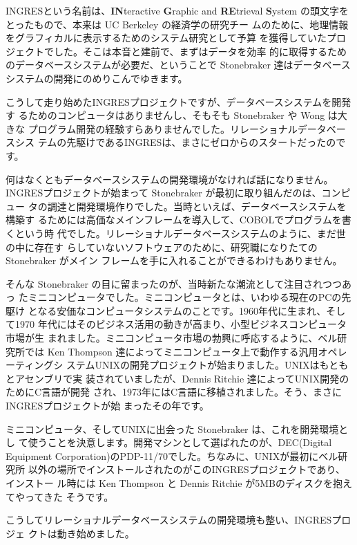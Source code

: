 

INGRESという名前は、{\bf IN}teractive {\bf G}raphic and {\bf RE}trieval
{\bf S}ystem の頭文字をとったもので、本来は UC Berkeley の経済学の研究チー
ムのために、地理情報をグラフィカルに表示するためのシステム研究として予算
を獲得していたプロジェクトでした。そこは本音と建前で、まずはデータを効率
的に取得するためのデータベースシステムが必要だ、ということで Stonebraker
達はデータベースシステムの開発にのめりこんでゆきます。


こうして走り始めたINGRESプロジェクトですが、データベースシステムを開発す
るためのコンピュータはありませんし、そもそも Stonebraker や Wong は大きな
プログラム開発の経験すらありませんでした。リレーショナルデータベースシス
テムの先駆けであるINGRESは、まさにゼロからのスタートだったのです。


何はなくともデータベースシステムの開発環境がなければ話になりません。
INGRESプロジェクトが始まって Stonebraker が最初に取り組んだのは、コンピュー
タの調達と開発環境作りでした。当時といえば、データベースシステムを構築す
るためには高価なメインフレームを導入して、COBOLでプログラムを書くという時
代でした。リレーショナルデータベースシステムのように、まだ世の中に存在す
らしていないソフトウェアのために、研究職になりたての Stonebraker がメイン
フレームを手に入れることができるわけもありません。


そんな Stonebraker の目に留まったのが、当時新たな潮流として注目されつつあっ
たミニコンピュータでした。ミニコンピュータとは、いわゆる現在のPCの先駆け
となる安価なコンピュータシステムのことです。1960年代に生まれ、そして1970
年代にはそのビジネス活用の動きが高まり、小型ビジネスコンピュータ市場が生
まれました。ミニコンピュータ市場の勃興に呼応するように、ベル研究所では
Ken Thompson 達によってミニコンピュータ上で動作する汎用オペレーティングシ
ステムUNIXの開発プロジェクトが始まりました。UNIXはもともとアセンブリで実
装されていましたが、Dennis Ritchie 達によってUNIX開発のためにC言語が開発
され、1973年にはC言語に移植されました。そう、まさにINGRESプロジェクトが始
まったその年です。


ミニコンピュータ、そしてUNIXに出会った Stonebraker は、これを開発環境とし
て使うことを決意します。開発マシンとして選ばれたのが、DEC(Digital
Equipment Corporation)のPDP-11/70でした。ちなみに、UNIXが最初にベル研究所
以外の場所でインストールされたのがこのINGRESプロジェクトであり、インストー
ル時には Ken Thompson と Dennis Ritchie が5MBのディスクを抱えてやってきた
そうです。


こうしてリレーショナルデータベースシステムの開発環境も整い、INGRESプロジェ
クトは動き始めました。


